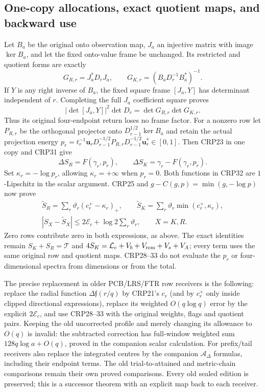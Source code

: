 \subsection{One-copy allocations, exact quotient maps, and backward use}
Let $B_a$ be the original onto observation map, $J_a$ an injective
matrix with image $\ker B_a$, and let the fixed onto-value frame be
unchanged. Its restricted and quotient forms are exactly
\[
G_{R,r}=J_a^*D_rJ_a,\qquad
G_{K,r}=(B_aD_r^{-1}B_a^*)^{-1}.\tag{CRP30}
\]
If $Y$ is any right inverse of $B_a$, the fixed square frame
$[J_a,Y]$ has determinant independent of $r$. Completing the full
$J_a$ coefficient square proves
\[
|\det[J_a,Y]|^2\det D_r=\det G_{R,r}\det G_{K,r}.
\tag{CRP31}
\]
Thus its original four-endpoint return loses no frame factor.
For a nonzero row let $P_{R,r}$ be the orthogonal projector onto
$D_{r-1}^{1/2}\ker B_a$ and retain the actual projection energy
$p_r=t_r^{-1}\mathbf u_rD_{r-1}^{-1/2}P_{R,r}
D_{r-1}^{-1/2}\mathbf u_r^*\in[0,1]$.
Then CRP23 in one copy and CRP31 give
\[
\Delta S_R=F(\gamma_r,p_r),\qquad
\Delta S_K=\gamma_r-F(\gamma_r,p_r).\tag{CRP32}
\]
Set $\kappa_r=-\log p_r$, allowing $\kappa_r=+\infty$ when $p_r=0$.
Both functions in CRP32 are $1$-Lipschitz in the scalar argument.
CRP25 and $g-C(g,p)=\min(g,-\log p)$ now prove
\[
\begin{gathered}
\widetilde S_R=\sum_r\vartheta_r(c_r^+-\kappa_r)_+,\qquad
\widetilde S_K=\sum_r\vartheta_r\min(c_r^+,\kappa_r),\\
\boxed{|S_X-\widetilde S_X|\le2\mathcal E_c+
 \log2\sum_r\vartheta_r,\qquad X=K,R.}\tag{CRP33}
\end{gathered}
\]
Zero rows contribute zero in both expressions, as above. The exact
identities remain $S_K+S_R=\mathcal T$ and
$4S_K=\mathcal L_e+V_b+V_{\rm rem}+V_s+V_A$; every term uses the same
original row and quotient maps. CRP28--33 do not evaluate the
$p_r$ or four-dimensional spectra from dimensions or from the total.

The precise replacement in older PCB/LRS/FTR row receivers is the
following: replace the radial function $\Delta\mathfrak f(r/q)$
by CRP21's $c_r$ (and by $c_r^+$ only inside clipped directional
expressions), replace its weighted $O(q\log q)$ error by the
explicit $2\mathcal E_c$, and use CRP28--33 with the original
weights, flags and quotient pairs. Keeping the old uncorrected
profile and merely changing its allowance to $O(q)$ is invalid:
the subtracted correction has full-window weighted sum
$128q\log a+O(q)$, proved in the companion scalar calculation.
For prefix/tail receivers also replace the integrated centres by
the companion $\mathcal A_\Delta$ formulas, including their endpoint
terms. The old trial-to-attained and metric-chain comparisons remain
their own proved comparisons. Every old sealed edition is preserved;
this is a successor theorem with an explicit map back to each receiver.
\endgroup
